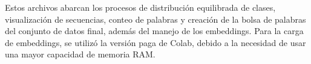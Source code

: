 \begin{itemize}
\end{itemize}

Estos archivos abarcan los procesos de distribución equilibrada de clases, visualización de secuencias, conteo de palabras y creación de la bolsa de palabras del conjunto de datos final, además del manejo de los embeddings. Para la carga de embeddings, se utilizó la versión paga de Colab, debido a la necesidad de usar una mayor capacidad de memoria RAM.
